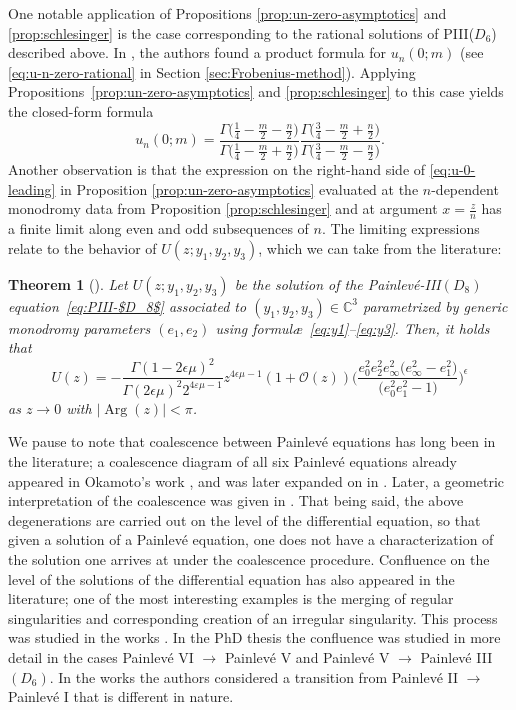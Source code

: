 \documentclass[pdftex]{sigma}
\numberwithin{equation}{section}
\newtheorem{Theorem}{Theorem}[section]
\newcommand{\C}{{\mathbb{C}}}
\renewcommand{\arg}{\operatorname{Arg}}
\begin{document}
One notable application of Propositions \ref{prop:un-zero-asymptotics} and \ref{prop:schlesinger} is the case corresponding to the rational solutions of PIII($D_6$) described above. In \cite{clarkson2018constructive}, the authors found a product formula for $u_n(0;m)$ (see \eqref{eq:u-n-zero-rational} in Section \ref{sec:Frobenius-method}). Applying Propositions~\ref{prop:un-zero-asymptotics} and \ref{prop:schlesinger} to this case yields the closed-form formula
\begin{equation}\label{eq:u-n-rat-leading}
u_n(0;m)=\frac{\Gamma\big(\frac{1}{4}-\frac{m}{2}-\frac{n}{2}\big)}{\Gamma \big(\frac{1}{4}-\frac{m}{2}+\frac{n}{2} \big)}\frac{\Gamma \big(\frac{3}{4}-\frac{m}{2}+\frac{n}{2} \big)}{\Gamma \big(\frac{3}{4}-\frac{m}{2}-\frac{n}{2} \big)}.
\end{equation}
Another observation is that the expression on the right-hand side of \eqref{eq:u-0-leading} in Proposition \ref{prop:un-zero-asymptotics} evaluated at the $n$-dependent monodromy data from Proposition \ref{prop:schlesinger} and at argument $x=\frac{z}{n}$ has a finite limit along even and odd subsequences of $n$. The limiting expressions relate to the behavior of $U(z;y_1,y_2,y_3)$, which we can take from the literature:
\begin{Theorem}[\cite{FIKN,IN,N}] \label{thm:D8-asymptotics-zero}
 Let $U(z;y_1,y_2,y_3)$ be the solution of the Painlev\'e-{\rm III}$(D_8)$ equation~\eqref{eq:PIII-$D_8$} associated to $(y_1,y_2,y_3) \in \C^3$ parametrized by generic monodromy parameters $(e_1,e_2)$ using formul\ae\ \eqref{eq:y1}--\eqref{eq:y3}. Then, it holds that
 \begin{equation*}
 U(z) = -\frac{ \Gamma (1 - 2\epsilon \mu)^2 }{\Gamma (2\epsilon \mu )^2 2^{4\varepsilon\mu-1} } z^{4 \epsilon \mu - 1} (1 + \mathcal{O}(z) )\Bigg(\dfrac{e_{0}^2 e_2^2 e_{\infty}^2 \big(e_{\infty}^2-e_{1}^2\big)}{
 \big(e_{0}^2 e_{1}^2-1\big)}\Bigg)^{\epsilon}
 \end{equation*}
 as $z\to 0$ with $|{\arg}(z)|<\pi$.
\end{Theorem}
We pause to note that coalescence between Painlev\'e equations has long been in the literature; a coalescence diagram of all six Painlev\'e equations already appeared in Okamoto's work \cite{O1}, and was later expanded on in \cite{OO}. Later, a geometric interpretation of the coalescence was given in \cite{CMR}. That being said, the above degenerations are carried out on the level of the differential equation, so that given a solution of a Painlev\'e equation, one does not have a characterization of the solution one arrives at under the coalescence procedure. Confluence on the level of the solutions of the differential equation has also appeared in the literature; one of the most interesting examples is the merging of regular singularities and corresponding creation of an irregular singularity. This process was studied in the works \cite{Glutsuk,Kitaev06}. In the PhD thesis \cite{Horrobin} the confluence was studied in more detail in the cases Painlev\'e VI $\to$ Painlev\'e V and Painlev\'e V $\to$ Painlev\'e III$(D_6)$. In the works \cite{Kapaev94,Kapaev_Kitaev} the authors considered a transition from Painlev\'e II $\to$ Painlev\'e I that is different in nature.
\end{document}
